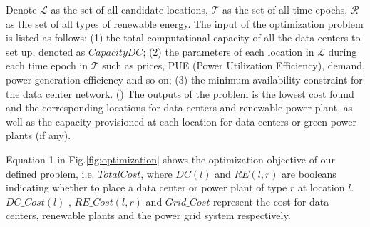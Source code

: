 Denote $\mathcal{L}$ as the set of all candidate locations, $\mathcal{T}$ as the set of all time epochs, $\mathcal{R}$ as the set of all types of renewable energy. The input of the optimization problem is listed as follows:
(1) the total computational capacity of all the data centers to set up, denoted as $CapacityDC$;
(2) the parameters of each location in $\mathcal{L}$ during each time epoch in $\mathcal{T}$ such as prices, PUE (Power Utilization Efficiency), demand, power generation efficiency and so on;
(3) the minimum availability constraint for the data center network. ()
The outputs of the problem is the lowest cost found and the corresponding locations for data centers and renewable power plant, as well as the capacity provisioned at each location for data centers or green power plants (if any).

Equation 1 in Fig.\ref{fig:optimization} shows the optimization objective of our defined problem, i.e. $TotalCost$, where $DC(l)$ and $RE(l,r)$ are booleans indicating whether to place a data center or power plant of type $r$ at location $l$. $DC\_Cost(l)$ , $RE\_Cost(l,r)$ and $Grid\_Cost$ represent the cost for data centers, renewable plants and the power grid system respectively.

